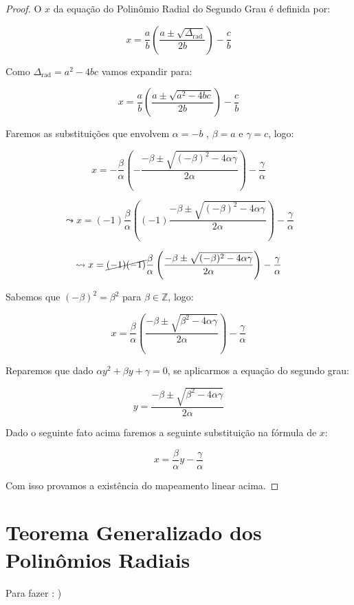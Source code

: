 \documentclass{article}
\begin{document}
\begin{proof}
O $x$ da equação do Polinômio Radial do Segundo Grau é definida por:

\[
x = \frac{a}{b}\left(\frac{a \pm \sqrt{\Delta_{\text{rad}}}}{2b}\right)- \frac{c}{b}
\]

Como $\Delta_{\text{rad}}= a^2-4bc$ vamos expandir para:

\[
x = \frac{a}{b}\left(\frac{a \pm \sqrt{a^2-4bc}}{2b}\right)- \frac{c}{b}
\]

Faremos as substituições que envolvem $\alpha = -b$ , $\beta = a$ e $\gamma = c$, logo:

\[
x = -\frac{\beta}{\alpha}\left(-\frac{-\beta \pm \sqrt{(-\beta)^2-4\alpha \gamma}}{2\alpha}\right)- \frac{\gamma}{\alpha}
\]

\[
\leadsto 
x = (-1)\frac{\beta}{\alpha}\left((-1)\frac{-\beta \pm \sqrt{(-\beta)^2-4\alpha \gamma}}{2\alpha}\right)- \frac{\gamma}{\alpha}
\]

\[
\leadsto 
x = \cancel{(-1)(-1)}\frac{\beta}{\alpha}\left(\frac{-\beta \pm \sqrt{(-\beta)^2-4\alpha \gamma}}{2\alpha}\right)- \frac{\gamma}{\alpha}
\]

Sabemos que $(-\beta)^2=\beta^2$ para $\beta \in \mathbb{Z}$, logo:

\[
x = \frac{\beta}{\alpha}\left(\frac{-\beta \pm \sqrt{\beta^2-4\alpha \gamma}}{2\alpha}\right)- \frac{\gamma}{\alpha}
\]

Reparemos que dado $\alpha y^2 + \beta y + \gamma = 0$, se aplicarmos a equação do segundo grau:

\[
y = \frac{-\beta \pm \sqrt{\beta^2-4\alpha \gamma}}{2\alpha}
\]

Dado o seguinte fato acima faremos a seguinte substituição na fórmula de $x$:

\[
x = \frac{\beta}{\alpha}y- \frac{\gamma}{\alpha}
\]

Com isso provamos a existência do mapeamento linear acima.
\end{proof}

\section{Teorema Generalizado dos Polinômios Radiais}

Para fazer : )
\end{document}
